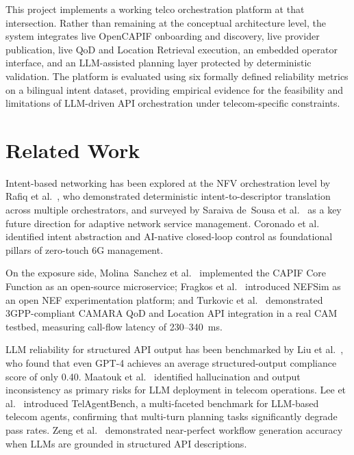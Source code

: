 \documentclass[conference]{IEEEtran}
\begin{document}
This project implements a working telco orchestration platform at that
intersection. Rather than remaining at the conceptual architecture level,
the system integrates live OpenCAPIF onboarding and discovery, live provider
publication, live QoD and Location Retrieval execution, an embedded operator
interface, and an LLM-assisted planning layer protected by deterministic
validation. The platform is evaluated using six formally defined reliability
metrics on a bilingual intent dataset, providing empirical evidence for the
feasibility and limitations of LLM-driven API orchestration under
telecom-specific constraints.

\section{Related Work}

Intent-based networking has been explored at the NFV orchestration level by
Rafiq et al.~\cite{rafiq2020}, who demonstrated deterministic intent-to-descriptor
translation across multiple orchestrators, and surveyed by Saraiva de~Sousa
et al.~\cite{saraiva2019} as a key future direction for adaptive network
service management. Coronado et al.~\cite{coronado2022} identified intent
abstraction and AI-native closed-loop control as foundational pillars of
zero-touch 6G management.

On the exposure side, Molina~Sanchez et al.~\cite{molina2022} implemented
the CAPIF Core Function as an open-source microservice; Fragkos et al.~\cite{nefsim2022}
introduced NEFSim as an open NEF experimentation platform; and Turkovic et al.~\cite{turkovic2025}
demonstrated 3GPP-compliant CAMARA QoD and Location API integration in a real
CAM testbed, measuring call-flow latency of 230--340~ms.

LLM reliability for structured API output has been benchmarked by Liu et al.~\cite{liu2024},
who found that even GPT-4 achieves an average structured-output compliance
score of only 0.40. Maatouk et al.~\cite{maatouk2025} identified hallucination
and output inconsistency as primary risks for LLM deployment in telecom
operations. Lee et al.~\cite{telagentbench2025} introduced TelAgentBench,
a multi-faceted benchmark for LLM-based telecom agents, confirming that
multi-turn planning tasks significantly degrade pass rates.
Zeng et al.~\cite{flowmind2023} demonstrated near-perfect workflow generation
accuracy when LLMs are grounded in structured API descriptions.
\end{document}
